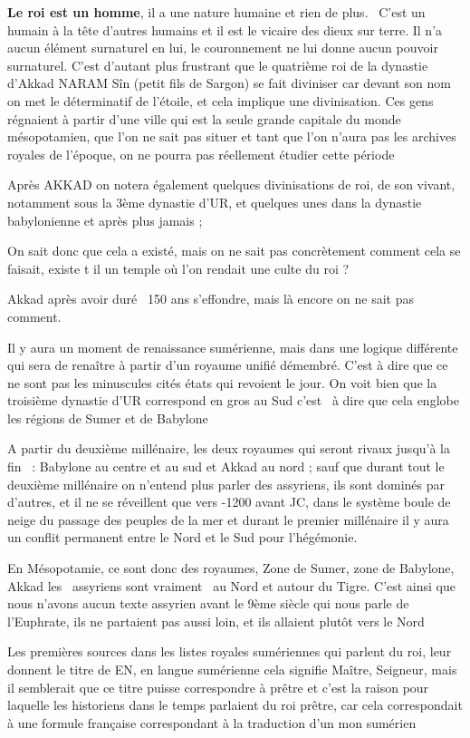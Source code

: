 \documentclass[a4paper]{article}
\begin{document}
\textbf{Le roi est un homme}, il a une nature humaine et rien de plus. \ C'est un humain à la tête d'autres humains et
il est le vicaire des dieux sur terre. Il n'a aucun élément surnaturel en lui, le couronnement ne lui donne aucun
pouvoir surnaturel. C'est d'autant plus frustrant que le quatrième roi de la dynastie d'Akkad NARAM Sîn (petit fils de
Sargon) se fait diviniser car devant son nom on met le déterminatif de l'étoile, et cela implique une divinisation. Ces
gens régnaient à partir d'une ville qui est la seule grande capitale du monde mésopotamien, que l'on ne sait pas situer
et tant que l'on n'aura pas les archives royales de l'époque, on ne pourra pas réellement étudier cette période

Après AKKAD on notera également quelques divinisations de roi, de son vivant, notamment sous la 3ème dynastie d'UR, et
quelques unes dans la dynastie babylonienne et après plus jamais ;

On sait donc que cela a existé, mais on ne sait pas concrètement comment cela se faisait, existe t il un temple où l'on
rendait une culte du roi ?

Akkad après avoir duré \ 150 ans s'effondre, mais là encore on ne sait pas comment.


Il y aura un moment de renaissance sumérienne, mais dans une logique différente qui sera de renaître à partir d'un
royaume unifié démembré. C'est à dire que ce ne sont pas les minuscules cités états qui revoient le jour. On voit bien
que la troisième dynastie d'UR correspond en gros au Sud c'est \ à dire que cela englobe les régions de Sumer et de
Babylone


A partir du deuxième millénaire, les deux royaumes qui seront rivaux jusqu'à la fin \ : Babylone au centre et au sud et
Akkad au nord ; sauf que durant tout le deuxième millénaire on n'entend plus parler des assyriens, ils sont dominés par
d'autres, et il ne se réveillent que vers -1200 avant JC, dans le système boule de neige du passage des peuples de la
mer et durant le premier millénaire il y aura un conflit permanent entre le Nord et le Sud pour l'hégémonie.


En Mésopotamie, ce sont donc des royaumes, Zone de Sumer, zone de Babylone, Akkad les \ assyriens sont vraiment \ au
Nord et autour du Tigre. C'est ainsi que nous n'avons aucun texte assyrien avant le 9ème siècle qui nous parle de
l'Euphrate, ils ne partaient pas aussi loin, et ils allaient plutôt vers le Nord


Les premières sources dans les listes royales sumériennes qui parlent du roi, leur donnent le titre de EN, en langue
sumérienne cela signifie Maître, Seigneur, mais il semblerait que ce titre puisse correspondre à prêtre et c'est la
raison pour laquelle les historiens dans le temps parlaient du roi prêtre, car cela correspondait à une formule
française correspondant à la traduction d'un mon sumérien
\end{document}
